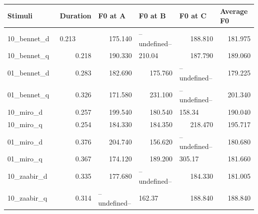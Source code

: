 \documentclass[a4paper]{article}
\begin{document}
\begin{table}[H]
    \label{tab:tablestressedsyl}
\begin{tabular}{|l|r|l|r|l|r|} 
\hline
Stimuli         & \multicolumn{1}{l|}{Duration} & F0 at A                           & \multicolumn{1}{l|}{F0 at B}            & F0 at C                       & \multicolumn{1}{l|}{Average F0}  \\ 
\hline
10\_bennet\_d~  & \multicolumn{1}{l|}{0.213}    & \multicolumn{1}{r|}{175.140} & \multicolumn{1}{l|}{--undefined--} & \multicolumn{1}{r|}{188.810} & 181.975                          \\ 
\hline
10\_bennet\_q~  & 0.218                         & \multicolumn{1}{r|}{190.330} & \multicolumn{1}{l|}{210.04}        & \multicolumn{1}{r|}{187.790} & 189.060                          \\ 
\hline
01\_bennet\_d~  & 0.283                         & \multicolumn{1}{r|}{182.690} & 175.760                            & --undefined--                & 179.225                          \\ 
\hline
01\_bennet\_q~  & 0.326                         & \multicolumn{1}{r|}{171.580} & 231.100                            & --undefined--                & 201.340                          \\ 
\hline
10\_miro\_d~    & 0.257                         & \multicolumn{1}{r|}{199.540} & 180.540                            & 158.34                       & 190.040                          \\ 
\hline
10\_miro\_q~    & 0.254                         & \multicolumn{1}{r|}{184.330} & 184.350                            & \multicolumn{1}{r|}{218.470} & 195.717                          \\ 
\hline
01\_miro\_d~    & 0.376                         & \multicolumn{1}{r|}{204.740} & 156.620                            & --undefined--                & 180.680                          \\ 
\hline
01\_miro\_q~    & 0.367                         & \multicolumn{1}{r|}{174.120} & 189.200                            & 305.17                       & 181.660                          \\ 
\hline
10\_zaabir\_d~  & 0.335                         & \multicolumn{1}{r|}{177.680} & \multicolumn{1}{l|}{--undefined--} & \multicolumn{1}{r|}{184.330} & 181.005                          \\ 
\hline
10\_zaabir\_q~  & 0.314                         & --undefined--                & \multicolumn{1}{l|}{162.37}        & \multicolumn{1}{r|}{188.840} & 188.840                          \\ 

\end{tabular}
\end{table}
\end{document}
